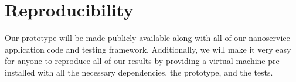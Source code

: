 \section{Reproducibility}

Our \name{} prototype will be made publicly available along with all of our nanoservice application code and testing framework.
Additionally, we will make it very easy for anyone to reproduce all of our results by providing a virtual machine pre-installed with all the necessary dependencies, the prototype, and the tests.